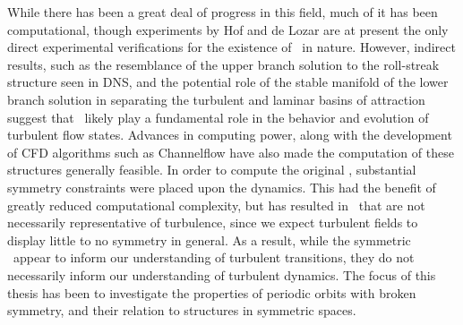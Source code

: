 While there has been a great deal of progress in this field, much of it has been computational, though experiments by Hof and de Lozar  are at present the only direct experimental verifications for the existence of \ecs~in nature. However, indirect results, such as the resemblance of the upper branch solution to the roll-streak structure seen in DNS, and the potential role of the stable manifold of the lower branch solution in separating the turbulent and laminar basins of attraction suggest that \ecs\ likely play a fundamental role in the behavior and evolution of turbulent flow states. Advances in computing power, along with the development of CFD algorithms such as Channelflow have also made the computation of these structures generally feasible. In order to compute the original \ecs, substantial symmetry constraints were placed upon the dynamics. This had the benefit of greatly reduced computational complexity, but has resulted in \ecs\ that are not necessarily representative of turbulence, since we expect turbulent fields to display little to no symmetry in general. As a result, while the symmetric \ecs\ 	appear to inform our understanding of turbulent transitions, they do not necessarily inform our understanding of turbulent dynamics. The focus of this thesis has been to investigate the properties of periodic orbits with broken symmetry, and their relation to structures in symmetric spaces. 
 
